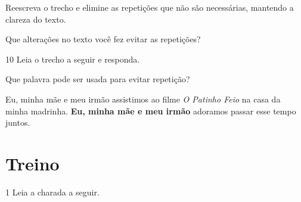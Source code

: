 \begin{escolha}
\item Reescreva o trecho e elimine as repetições que não são necessárias,
mantendo a clareza do texto.\\

\item Que alterações no texto você fez evitar as repetições?\\
\end{escolha}

\num{10} Leia o trecho a seguir e responda. 

Que palavra pode ser usada para evitar repetição?

\begin{myquote}
Eu, minha mãe e meu irmão assistimos ao filme \textit{O Patinho Feio} na
casa da minha madrinha. \textbf{Eu, minha mãe e meu irmão} adoramos passar
esse tempo juntos.
\end{myquote}


\section*{Treino}

\num{1} Leia a charada a seguir.

